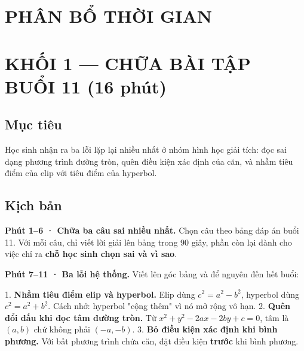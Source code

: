 \documentclass[11pt, a4paper]{article}
\begin{document}

\section{PHÂN BỔ THỜI GIAN}


\section{KHỐI 1 — CHỮA BÀI TẬP BUỔI 11 (16 phút)}

\subsection{Mục tiêu}

Học sinh nhận ra ba lỗi lặp lại nhiều nhất ở nhóm hình học giải tích: đọc sai dạng phương trình đường tròn, quên điều kiện xác định của căn, và nhầm tiêu điểm của elip với tiêu điểm của hyperbol.

\subsection{Kịch bản}

\textbf{Phút 1–6 · Chữa ba câu sai nhiều nhất.} Chọn câu theo bảng đáp án buổi 11. Với mỗi câu, chỉ viết lời giải lên bảng trong 90 giây, phần còn lại dành cho việc chỉ ra \textbf{chỗ học sinh chọn sai và vì sao}.

\textbf{Phút 7–11 · Ba lỗi hệ thống.} Viết lên góc bảng và để nguyên đến hết buổi:

1. \textbf{Nhầm tiêu điểm elip và hyperbol.} Elip dùng $c^2 = a^2 - b^2$, hyperbol dùng $c^2 = a^2 + b^2$. Cách nhớ: hyperbol "cộng thêm" vì nó mở rộng vô hạn.
2. \textbf{Quên đổi dấu khi đọc tâm đường tròn.} Từ $x^2 + y^2 - 2ax - 2by + c = 0$, tâm là $(a, b)$ chứ không phải $(-a, -b)$.
3. \textbf{Bỏ điều kiện xác định khi bình phương.} Với bất phương trình chứa căn, đặt điều kiện \textbf{trước} khi bình phương.
\end{document}

